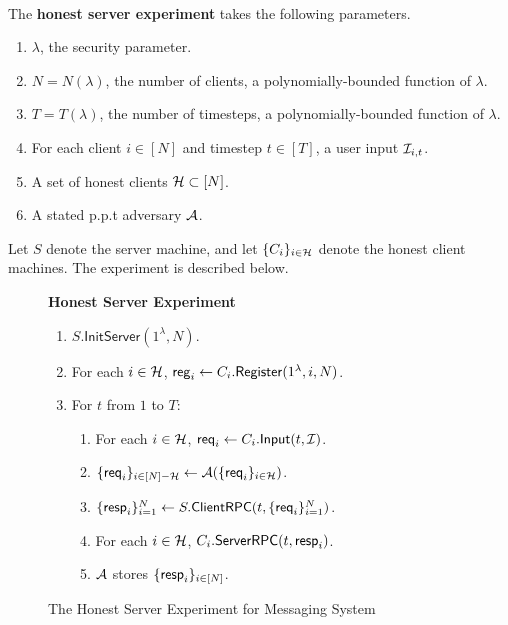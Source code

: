 \begin{definition}  \hfill\\
\label{defn:messaging-honest-server-experiment}
The \textbf{honest server experiment} takes the following parameters.

\begin{enumerate}
    \item $\lambda$, the security parameter.
    \item $N = N(\lambda)$, the number of clients, a polynomially-bounded function of $\lambda$.
    \item $T = T(\lambda)$, the number of timesteps, a polynomially-bounded function of $\lambda$.
    \item For each client $i \in [N]$ and timestep $t \in [T]$, a user input $\mathcal{I}_{i, t}$.
    \item A set of honest clients $\mathcal{H} \subset [N]$.
    \item A stated p.p.t adversary $\mathcal{A}$.
\end{enumerate}

Let $S$ denote the server machine, and let $\{C_i\}_{i \in \mathcal{H}}$ denote the honest client machines. The experiment is described below.
\begin{figure}[ht!]
\begin{framed}
\textbf{Honest Server Experiment}
\begin{enumerate}
\item $S.\mathsf{InitServer}(1^{\lambda}, N)$. 
\item For each $i \in \mathcal{H}$, $\mathsf{reg}_i \leftarrow C_i.\mathsf{Register}(1^{\lambda}, i, N)$. 
\item For $t$ from $1$ to $T$:
    \begin{enumerate}
    \item For each $i \in \mathcal{H}$, $\mathsf{req}_i \leftarrow C_i.\mathsf{Input}(t, \mathcal{I})$.

    \item $\{\mathsf{req}_i\}_{i \in [N] - \mathcal{H}} \leftarrow \mathcal{A}(\{\mathsf{req}_i\}_{i \in \mathcal{H}})$.
    
    \item $\{\mathsf{resp}_i\}_{i = 1}^N \leftarrow S.\mathsf{ClientRPC}(t, \{\mathsf{req}_i\}_{i = 1}^N)$.
    
    \item For each $i \in \mathcal{H}$, $C_i.\mathsf{ServerRPC}(t, \mathsf{resp}_i)$.

    \item $\mathcal{A}$ stores $\{\mathsf{resp}_i\}_{i \in [N]}$.
    \end{enumerate}
\end{enumerate}
\end{framed}
\caption{The Honest Server Experiment for Messaging System}
\label{expr:messaging-honest-server}
\end{figure}

\end{definition}

